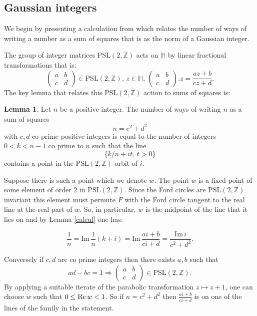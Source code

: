 \documentclass[12pt]{amsart}
\theoremstyle{plain}
\theoremstyle{definition}
\newtheorem{lem}[thm]{Lemma}
\def\HH{\mathbb{H}}
\def\im{\mathrm{Im}\,}
\def\ZZ{\mathbb{Z}}
\def\sl2{\mathrm{PSL}(2, \ZZ)}
\begin{document}
\subsection{Gaussian integers}

We begin by presenting a calculation from \cite{vlad}
which relates the number of ways of writing a number as a sum of
squares that is as the norm of a Gaussian integer.

The group of integer matrices $\sl2$  acts on $\HH$ by linear fractional transformations
that is:
$$\begin{pmatrix}
a & b \\
c & d
\end{pmatrix} \in \sl2,\, z\in \HH,\, 
\begin{pmatrix}
a & b \\
c & d
\end{pmatrix}. z = \frac{az + b}{cz + d}.
$$
The key lemma that relates this  $\sl2$ action to sums of squares is:

\begin{lem} \label{squares}
Let $n$ be a positive integer.
The number of  ways of writing $n$  as a  sum of squares
$$n = c^2 + d^2$$
with $c,d$ co prime positive  integers
is equal to the number of  integers $0 < k < n-1$ co prime to $n$
such that the line
$$\{  k/n + i t,\, t >0 \}$$
contains  a point in the $\sl2$  orbit of $i$.
\end{lem}


\proof  Suppose there is such  a point which we denote  $w$.
The point $w$ is a fixed point of some  element of order 2 in $\sl2$.
Since the Ford circles are $\sl2$ invariant
this element must permute $F$ with the Ford circle tangent 
to the real line  at the real part of $w$.
So, in particular, $w$ is the midpoint of the line 
that it lies on 
and by  Lemma \ref{calcul} one has:


\begin{equation}
\label{gaussian integers}
\frac{1}{n} = \im \frac{1 }{n}(k + i)  
= \im  \frac{ai +b}{ci+d }
= \frac{\im i} {c^2 + d^2}.
\end{equation}

Conversely if $c,d$ are co prime integers 
 then there exists $a,b$ such that
 $$ad - bc = 1 \Rightarrow  
 \begin{pmatrix}
 a & b \\
 c & d
 \end{pmatrix} \in \sl2.
$$
By applying a suitable iterate of the parabolic transformation 
$z \mapsto z + 1$,
one can choose $w$ such that $0 \leq \text{Re\,} w < 1$.
So if $n = c^2 + d^2$ then $\frac{ai +b}{ci+d }$
is on one of the lines of the family in the statement.
\end{document}
